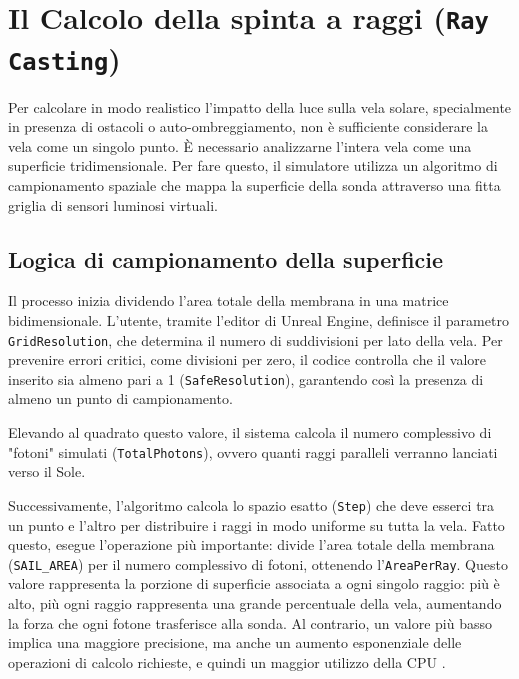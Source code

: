 
\section{Il Calcolo della spinta a raggi (\texttt{Ray Casting})}

Per calcolare in modo realistico l'impatto della luce sulla vela solare, specialmente in presenza di ostacoli o auto-ombreggiamento, non è sufficiente considerare la vela come un singolo punto. È necessario analizzarne l'intera vela come una superficie tridimensionale. Per fare questo, il simulatore utilizza un algoritmo di campionamento spaziale che mappa la superficie della sonda attraverso una fitta griglia di sensori luminosi virtuali.


\subsection{Logica di campionamento della superficie}

Il processo inizia dividendo l'area totale della membrana in una matrice bidimensionale. L'utente, tramite l'editor di Unreal Engine, definisce il parametro \lstinline|GridResolution|, che determina il numero di suddivisioni per lato della vela. Per prevenire errori critici, come divisioni per zero, il codice controlla che il valore inserito sia almeno pari a 1 (\lstinline|SafeResolution|), garantendo così la presenza di almeno un punto di campionamento.

Elevando al quadrato questo valore, il sistema calcola il numero complessivo di "fotoni" simulati (\lstinline|TotalPhotons|), ovvero quanti raggi paralleli verranno lanciati verso il Sole.

Successivamente, l'algoritmo calcola lo spazio esatto (\lstinline|Step|) che deve esserci tra un punto e l'altro per distribuire i raggi in modo uniforme su tutta la vela. Fatto questo, esegue l'operazione più importante: divide l'area totale della membrana (\lstinline|SAIL_AREA|) per il numero complessivo di fotoni, ottenendo l'\lstinline|AreaPerRay|. Questo valore rappresenta la porzione di superficie associata a ogni singolo raggio: più è alto, più ogni raggio rappresenta una grande percentuale della vela, aumentando la forza che ogni fotone trasferisce alla sonda. Al contrario, un valore più basso implica una maggiore precisione, ma anche un aumento esponenziale delle operazioni di calcolo richieste, e quindi un maggior utilizzo della CPU \cite{ericson2004real}.

